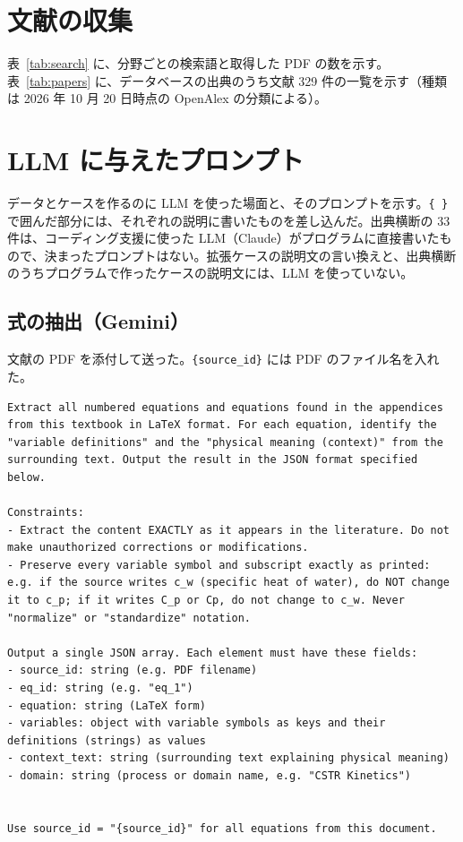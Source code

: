 \documentclass[11pt,a4paper]{ltjsarticle}
\begin{document}
\clearpage
\section{文献の収集}\label{app:papers}
表~\ref{tab:search} に、分野ごとの検索語と取得した PDF の数を示す。表~\ref{tab:papers} に、データベースの出典のうち文献 329 件の一覧を示す（種類は 2026 年 10 月 20 日時点の OpenAlex の分類による）。




\section{LLM に与えたプロンプト}\label{app:prompts}
データとケースを作るのに LLM を使った場面と、そのプロンプトを示す。\texttt{\{ \}} で囲んだ部分には、それぞれの説明に書いたものを差し込んだ。出典横断の 33 件は、コーディング支援に使った LLM（Claude）がプログラムに直接書いたもので、決まったプロンプトはない。拡張ケースの説明文の言い換えと、出典横断のうちプログラムで作ったケースの説明文には、LLM を使っていない。

\subsection{式の抽出（Gemini）}
文献の PDF を添付して送った。\texttt{\{source\_id\}} には PDF のファイル名を入れた。
\begin{Verbatim}[fontsize=\scriptsize, breaklines=true, frame=single]
Extract all numbered equations and equations found in the appendices from this textbook in LaTeX format. For each equation, identify the "variable definitions" and the "physical meaning (context)" from the surrounding text. Output the result in the JSON format specified below.

Constraints:
- Extract the content EXACTLY as it appears in the literature. Do not make unauthorized corrections or modifications.
- Preserve every variable symbol and subscript exactly as printed: e.g. if the source writes c_w (specific heat of water), do NOT change it to c_p; if it writes C_p or Cp, do not change to c_w. Never "normalize" or "standardize" notation.

Output a single JSON array. Each element must have these fields:
- source_id: string (e.g. PDF filename)
- eq_id: string (e.g. "eq_1")
- equation: string (LaTeX form)
- variables: object with variable symbols as keys and their definitions (strings) as values
- context_text: string (surrounding text explaining physical meaning)
- domain: string (process or domain name, e.g. "CSTR Kinetics")


Use source_id = "{source_id}" for all equations from this document.
\end{Verbatim}
\end{document}
